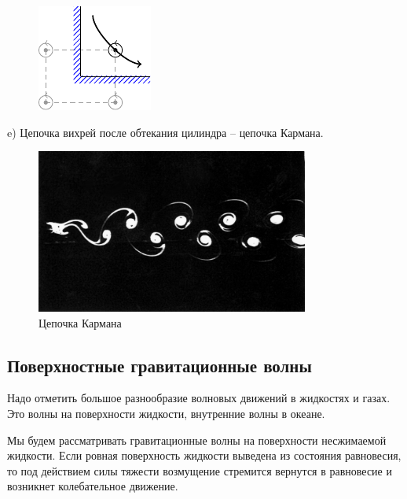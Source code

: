 \begin{figure}[H]
    \centering
    \includegraphics[scale=1.75]{img/5G}
    \caption{}
    \label{fig:figure1}
\end{figure}

e) Цепочка вихрей после обтекания цилиндра -- цепочка Кармана.
\begin{figure}[H]
	\centering
	\includegraphics[width=0.8\textwidth]{photo/karman.png}
	\caption{Цепочка Кармана}
	\label{fig:figure5}
\end{figure}



\newpage
\subsection{Поверхностные гравитационные волны}

Надо отметить большое разнообразие волновых движений в
жидкостях и газах. Это волны на поверхности жидкости, внутренние
волны в океане. 

Мы будем рассматривать гравитационные волны на поверхности
несжимаемой жидкости. Если ровная поверхность жидкости выведена
из состояния равновесия, то под действием силы тяжести возмущение
стремится вернутся в равновесие и возникнет колебательное движение.


